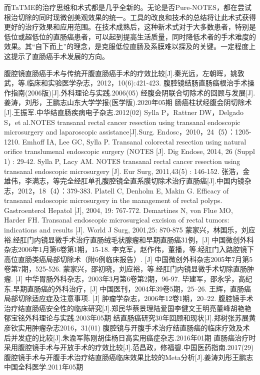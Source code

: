 \documentclass[a4paper,11pt,onecolumn,twoside]{article}
\begin{document}
\begin{multicols}{2}
    而TaTME的治疗思维和术式都是几乎全新的。无论是否Pure-NOTES，都在尝试根治切除的同时现微创美观效果的统一。工具的改良和技术的总结将让此术式获得更好的治疗效果和应用范围。在技术成熟后，这种新术式对于大多数患者，特别是低位或超低位的直肠癌患者，可以起到提高生活质量，同时降低术者的手术难度的效果。其“自下而上”的理念，是克服低位直肠及系膜难以探及的关键。一定程度上这提示了直肠癌手术发展的方向。
    \small
    \begin{thebibliography}{14}
        \setlength{\parskip}{0pt}  %
        腹腔镜直肠癌手术与传统开腹直肠癌手术的疗效比较[J].秦光远，左朝晖，姚敦武，等.临床和实验医学杂志，2012，10(6):421-423.
        腹腔镜结肠直肠癌根治手术操作指南(2006版)[J].外科理论与实践.2006(05)
        经腹会阴联合切除术的回顾与发展[J].姜涛，刘彤，王鹏志山东大学学报(医学版).2020年05期
        肠癌柱状经腹会阴切除术[J].王振军.中华结直肠疾病电子杂志.2012(02)
        Sylla P，Rattner DW，Delgado S，et al.NOTES transanal rectal cancer resection using transanal endoscopic microsurgery and laparoscopic assistance[J].Surg. Endosc，2010，24（5）：1205-1210.
        Emhoff IA, Lee GC, Sylla P. Transanal colorectal resection using natural orifice translumenal endoscopic surgery (NOTES [J]. Dig Endose, 2014, 26 (Suppl 1) : 29-42.
        Sylla P, Lacy AM. NOTES transanal rectal cancer resection using transanal endoscopic microsurgery [J]. Eur Surg, 2011,43(5) : 146-152.
        张浩，金雄伟，李满志，等完全经肛单孔腹腔镜全直系膜切除术治疗直肠癌[J].中国内镜杂志，2012，18（4）：379-383.
        Platell C, Denholm E, Makin G. Efficacy of transanal endoscopic microsurgery in the management of rectal polyps. Gastroenterol Hepatol [J], 2004, 19: 767-772.
        Demartines N, von Flue MO, Harder FH. Transanal endoscopic microsurgical excision of rectal tumors: indications and results [J]. World J Surg, 2001,25: 870-875
        蒙家兴，林国乐，刘应裕.经肛门内镜显微手术治疗直肠绒毛状腺瘤和早期直肠癌31例，[J] 中国微创外科杂志2006年1月第6卷第1期，15-18.
        李克军，赵作伟，董播，等.经肛门入路腔镜下高位直肠类癌局部切除术（附6例临床报告）. [J] 中国微创外科杂志2005年7月第5卷第7期，525-526.
        蒙家兴，邵初晓，刘应裕，等.经肛门内镜显微手术切除直肠肿瘤. [J] 中华胃肠外科杂志，2003年3月第6卷第2期，96-97.
        毕建军，邵永孚，高纪东.早期直肠癌的外科治疗，[J] 中国医刊，2004年39卷5期，25--26.
        王辉，直肠癌局部切除适应症及注意事项. [J] 肿瘤学杂志，2006年12卷1期，20--22.
        腹腔镜手术治疗结直肠癌安全性的临床研究[J].郑民华蔡景理陆爱国李健文王明亮董峰胡艳艳郁宝铭外科理论与实践.2003年05期
        结直肠癌研究30年回顾和现状[J].郑树张苏展黄彦钦实用肿瘤杂志2016，31(01)
        腹腔镜与开腹手术治疗结直肠癌的临床疗效及术后并发症的比较[J].朱渝军陈刚胡佳杨日高实用癌症杂志.2016年01期
        直肠癌治疗时采用腹腔镜手术与开放手术的疗效比较[J].范昌政，修福鋆.中国医药指南.2017(29)
        腹腔镜手术与开腹手术治疗结直肠癌临床效果比较的Meta分析[J].姜涛刘彤王鹏志中国全科医学.2011年05期



\end{thebibliography}
\end{multicols}
\end{document}
